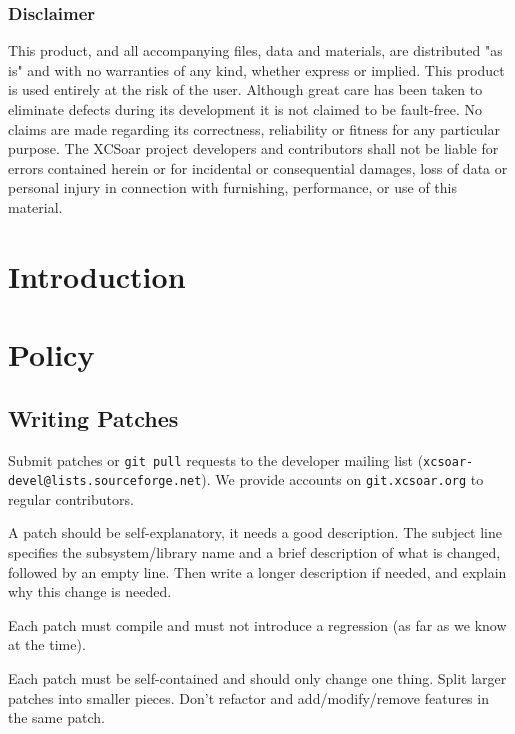 \documentclass[a4paper,12pt]{refrep}
\begin{document}
\subsection*{Disclaimer}

This product, and all accompanying files, data and materials, are
distributed "as is" and with no warranties of any kind, whether
express or implied.  This product is used entirely at the risk of the
user.  Although great care has been taken to eliminate defects during
its development it is not claimed to be fault-free. No claims are made
regarding its correctness, reliability or fitness for any particular
purpose.  The XCSoar project developers and contributors shall not be
liable for errors contained herein or for incidental or consequential
damages, loss of data or personal injury in connection with
furnishing, performance, or use of this material.


\chapter{Introduction}\label{cha:introduction}

\chapter{Policy}\label{cha:policy}

\section{Writing Patches}

Submit patches or \texttt{git pull} requests to the developer mailing
list (\texttt{xcsoar-devel@lists.sourceforge.net}).  We provide
accounts on \texttt{git.xcsoar.org} to regular contributors.

A patch should be self-explanatory, it needs a good description.  The
subject line specifies the subsystem/library name and a brief
description of what is changed, followed by an empty line.  Then write
a longer description if needed, and explain why this change is needed.

Each patch must compile and must not introduce a regression (as far as
we know at the time).

Each patch must be self-contained and should only change one thing.
Split larger patches into smaller pieces.  Don't refactor and
add/modify/remove features in the same patch.
\end{document}
